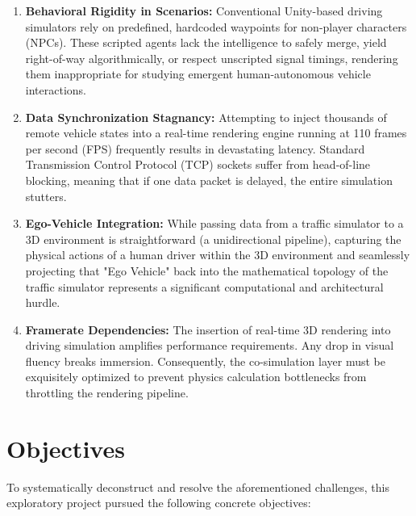 \begin{enumerate}[label={\color{AccentTeal}\bfseries\arabic*.}, leftmargin=2em, itemsep=4pt]
    \item \textbf{Behavioral Rigidity in Scenarios:} Conventional Unity-based driving simulators rely on predefined, hardcoded waypoints for non-player characters (NPCs). These scripted agents lack the intelligence to safely merge, yield right-of-way algorithmically, or respect unscripted signal timings, rendering them inappropriate for studying emergent human-autonomous vehicle interactions.
    
    \item \textbf{Data Synchronization Stagnancy:} Attempting to inject thousands of remote vehicle states into a real-time rendering engine running at 110 frames per second (FPS) frequently results in devastating latency. Standard Transmission Control Protocol (TCP) sockets suffer from head-of-line blocking, meaning that if one data packet is delayed, the entire simulation stutters.
    
    \item \textbf{Ego-Vehicle Integration:} While passing data from a traffic simulator to a 3D environment is straightforward (a unidirectional pipeline), capturing the physical actions of a human driver within the 3D environment and seamlessly projecting that "Ego Vehicle" back into the mathematical topology of the traffic simulator represents a significant computational and architectural hurdle.
    
    \item \textbf{Framerate Dependencies:} The insertion of real-time 3D rendering into driving simulation amplifies performance requirements. Any drop in visual fluency breaks immersion. Consequently, the co-simulation layer must be exquisitely optimized to prevent physics calculation bottlenecks from throttling the rendering pipeline.
\end{enumerate}

\section{Objectives}

To systematically deconstruct and resolve the aforementioned challenges, this exploratory project pursued the following concrete objectives:

